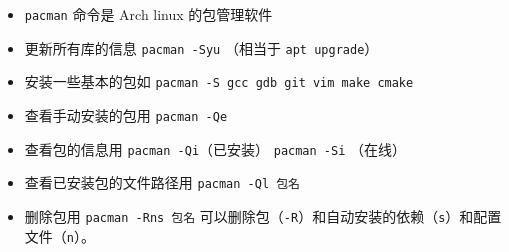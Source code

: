 
\begin{issues}
\issueDraft
\end{issues}

\begin{itemize}
\item \verb`pacman` 命令是 Arch linux 的包管理软件
\item 更新所有库的信息 \verb`pacman -Syu` （相当于 \verb`apt upgrade`）
\item 安装一些基本的包如 \verb`pacman -S gcc gdb git vim make cmake`
\item 查看手动安装的包用 \verb`pacman -Qe`
\item 查看包的信息用 \verb`pacman -Qi`（已安装） \verb`pacman -Si` （在线）
\item 查看已安装包的文件路径用 \verb`pacman -Ql 包名`
\item 删除包用 \verb`pacman -Rns 包名` 可以删除包（\verb`-R`）和自动安装的依赖（\verb`s`）和配置文件（\verb`n`）。
\end{itemize}
